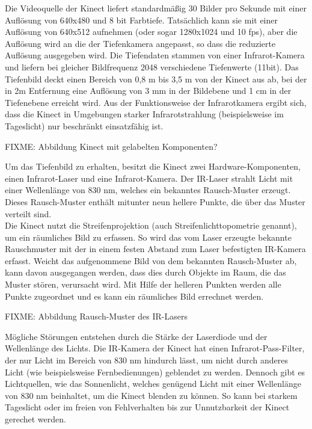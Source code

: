 \documentclass[12pt,a4paper,ngerman]{scrartcl}
\begin{document}
Die Videoquelle der Kinect liefert standardmäßig 30 Bilder pro Sekunde mit einer
Auflösung von 640x480 und 8 bit Farbtiefe. Tatsächlich kann sie mit
einer Auflösung von 640x512 aufnehmen (oder sogar 1280x1024 und 10 fps), aber die 
Auflösung wird an die der Tiefenkamera angepasst, so dass die reduzierte Auflösung 
ausgegeben wird. Die Tiefendaten stammen von einer 
Infrarot-Kamera und liefern bei gleicher Bildfrequenz 2048 verschiedene 
Tiefenwerte (11bit). Das Tiefenbild deckt einen Bereich von 0,8 m bis 3,5 m von der
Kinect aus ab, bei der in 2m Entfernung eine Auflösung von 3 mm in der Bildebene und
1 cm in der Tiefenebene erreicht wird. Aus der Funktionsweise der Infrarotkamera
ergibt sich, dass die Kinect in Umgebungen starker Infrarotstrahlung (beispielsweise
im Tageslicht) nur beschränkt einsatzfähig ist.\cite{hacking}

{\color{red} FIXME: Abbildung Kinect mit gelabelten Komponenten?}

Um das Tiefenbild zu erhalten, besitzt die Kinect zwei Hardware-Komponenten, einen
Infrarot-Laser und eine Infrarot-Kamera. Der IR-Laser strahlt Licht mit einer Wellenlänge
von 830 nm, welches ein bekanntes Rausch-Muster erzeugt. Dieses Rausch-Muster enthält
mitunter neun hellere Punkte, die über das Muster verteilt sind.\\
Die Kinect nutzt die Streifenprojektion (auch Streifenlichttopometrie genannt), um ein
räumliches Bild zu erfassen. So wird das vom Laser erzeugte bekannte Rauschmuster mit der
in einem festen Abstand zum Laser befestigten IR-Kamera erfasst. Weicht das aufgenommene
Bild von dem bekannten Rausch-Muster ab, kann davon ausgegangen werden, dass dies durch
Objekte im Raum, die das Muster stören, verursacht wird. Mit Hilfe der helleren Punkten werden
alle Punkte zugeordnet und es kann ein räumliches Bild errechnet werden.

{\color{red} FIXME: Abbildung Rausch-Muster des IR-Lasers}

Mögliche Störungen entstehen durch die Stärke der Laserdiode und der Wellenlänge des Lichts.
Die IR-Kamera der Kinect hat einen Infrarot-Pass-Filter, der nur Licht im Bereich von 830 nm
hindurch lässt, um nicht durch anderes Licht (wie beispielsweise Fernbedienungen) geblendet zu
werden. Dennoch gibt es Lichtquellen, wie das Sonnenlicht, welches genügend Licht mit einer
Wellenlänge von 830 nm  beinhaltet, um die Kinect blenden zu können. So kann bei starkem
Tageslicht oder im freien von Fehlverhalten bis zur Unnutzbarkeit der Kinect gerechet werden.
\end{document}
